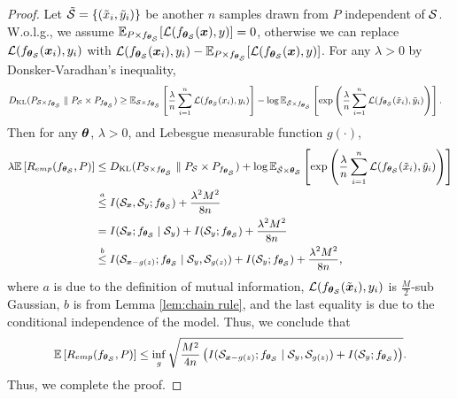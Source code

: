 \begin{proof}
	Let $\tilde{\mathcal{S}} = \{(\tilde{x}_{i}, \tilde{y}_{i})\}$ be another $n$ samples drawn from $P$ independent of $\mathcal{S}$. W.o.l.g., we assume $\mathbb{E}_{P\times f_{\text{\boldmath{$\theta$}}_{\mathcal{S}}}}[\mathcal{L}(f_{\text{\boldmath{$\theta$}}_{\mathcal{S}}}(\boldsymbol{x}), y)] = 0$, otherwise we can replace $\mathcal{L}(f_{\text{\boldmath{$\theta$}}_{\mathcal{S}}}(\boldsymbol{x}_{i}), y_{i})$  with $\mathcal{L}(f_{\text{\boldmath{$\theta$}}_{\mathcal{S}}}(\boldsymbol{x}_{i}), y_{i}) - \mathbb{E}_{P\times f_{\text{\boldmath{$\theta$}}_{\mathcal{S}}}}[\mathcal{L}(f_{\text{\boldmath{$\theta$}}_{\mathcal{S}}}(\boldsymbol{x}), y)]$. For any $\lambda > 0$ by Donsker-Varadhan's inequality, 
	\begin{equation}
		\small
		\begin{aligned}
			D_{\mathrm{KL}}(P_{\cS\times f_{\btheta_{\cS}}}\parallel P_{\cS}\times P_{f_{\btheta_{\cS}}}) & \geq \mE_{\cS\times f_{\btheta_{\cS}}}\left[\frac{\lambda}{n}\sum\limits_{i=1}^{n}\cL(f_{\btheta_{\cS}}(x_{i}), y_{i})\right] - \log\mE_{\tilde{\cS}\times f_{\btheta_{\cS}}}\left[\exp\left(\frac{\lambda}{n}\sum\limits_{i=1}^{n}\cL(f_{\btheta_{\cS}}(\tilde{x}_{i}), \tilde{y}_{i})\right)\right].
		\end{aligned}
	\end{equation}
	Then for any $\text{\boldmath{$\theta$}}$, $\lambda > 0$, and Lebesgue measurable function $g(\cdot)$, 
	\begin{equation}
		\small
		\begin{aligned}
			\lambda\mE\left[R_{emp}(f_{\btheta_{\cS}}, P)\right] & \leq D_{\mathrm{KL}}(P_{\cS\times f_{\btheta_{\cS}}}\parallel P_{\cS}\times P_{f_{\btheta_{\cS}}}) + \log\mE_{\tilde{\cS}\times\btheta_{\cS}}\left[\exp\left(\frac{\lambda}{n}\sum\limits_{i=1}^{n}\cL(f_{\btheta_{\cS}}(\tilde{x}_{i}), \tilde{y}_{i})\right)\right] \\
			& \overset{a}{\leq} I(\cS_{\bx}, \cS_{y}; f_{\btheta_{\cS}}) + \frac{\lambda^{2}M^{2}}{8n} \\
			& = I(\cS_{\bx}; f_{\btheta_{\cS}}\mid \cS_{y}) + I(\cS_{y}; f_{\btheta_{\cS}}) + \frac{\lambda^{2}M^{2}}{8n} \\
			& \overset{b}{\leq} I(\cS_{\bx - g(z)}; f_{\btheta_{\cS}}\mid \cS_{y}, \cS_{g(z)}) + I(\cS_{y}; f_{\btheta_{\cS}}) + \frac{\lambda^{2}M^{2}}{8n}, 
		\end{aligned}
	\end{equation}
	where $a$ is due to the definition of mutual information, $\mathcal{L}(f_{\text{\boldmath{$\theta$}}_{\mathcal{S}}}(\tilde{\boldsymbol{x}}_{i}), y_{i})$ is $\frac{M}{2}$-sub Gaussian, $b$ is from Lemma \ref{lem:chain rule}, and the last equality is due to the conditional independence of the model. Thus, we conclude that 
	\begin{equation}
		\small
		\mE\left[R_{emp}(f_{\btheta_{\cS}}, P)\right] \leq \inf_{g}\sqrt{\frac{M^{2}}{4n}\left(I(\cS_{\bx - g(z)}; f_{\btheta_{\cS}}\mid \cS_{y}, \cS_{g(z)}) + I(\cS_{y}; f_{\btheta_{\cS}})\right)}. 
	\end{equation}
	Thus, we complete the proof. 
\end{proof}
